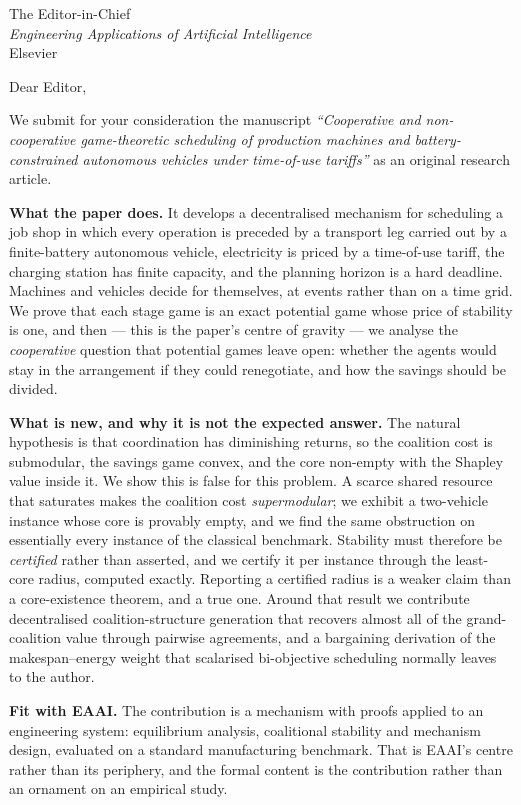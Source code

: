 \documentclass[11pt]{letter}
\begin{document}
\begin{letter}{The Editor-in-Chief\\\textit{Engineering Applications of Artificial Intelligence}\\Elsevier}

\opening{Dear Editor,}

We submit for your consideration the manuscript \textit{``Cooperative and non-cooperative
game-theoretic scheduling of production machines and battery-constrained autonomous vehicles
under time-of-use tariffs''} as an original research article.

\textbf{What the paper does.} It develops a decentralised mechanism for scheduling a job shop
in which every operation is preceded by a transport leg carried out by a finite-battery
autonomous vehicle, electricity is priced by a time-of-use tariff, the charging station has
finite capacity, and the planning horizon is a hard deadline. Machines and vehicles decide
for themselves, at events rather than on a time grid. We prove that each stage game is an
exact potential game whose price of stability is one, and then --- this is the paper's centre
of gravity --- we analyse the \emph{cooperative} question that potential games leave open:
whether the agents would stay in the arrangement if they could renegotiate, and how the
savings should be divided.

\textbf{What is new, and why it is not the expected answer.} The natural hypothesis is that
coordination has diminishing returns, so the coalition cost is submodular, the savings game
convex, and the core non-empty with the Shapley value inside it. We show this is false for
this problem. A scarce shared resource that saturates makes the coalition cost
\emph{supermodular}; we exhibit a two-vehicle instance whose core is provably empty, and we
find the same obstruction on essentially every instance of the classical benchmark. Stability
must therefore be \emph{certified} rather than asserted, and we certify it per instance
through the least-core radius, computed exactly. Reporting a certified radius is a weaker
claim than a core-existence theorem, and a true one. Around that result we contribute
decentralised coalition-structure generation that recovers almost all of the
grand-coalition value through pairwise agreements, and a bargaining derivation of the
makespan--energy weight that scalarised bi-objective scheduling normally leaves to the
author.

\textbf{Fit with EAAI.} The contribution is a mechanism with proofs applied to an engineering
system: equilibrium analysis, coalitional stability and mechanism design, evaluated on a
standard manufacturing benchmark. That is EAAI's centre rather than its periphery, and the
formal content is the contribution rather than an ornament on an empirical study.


\end{letter}
\end{document}
